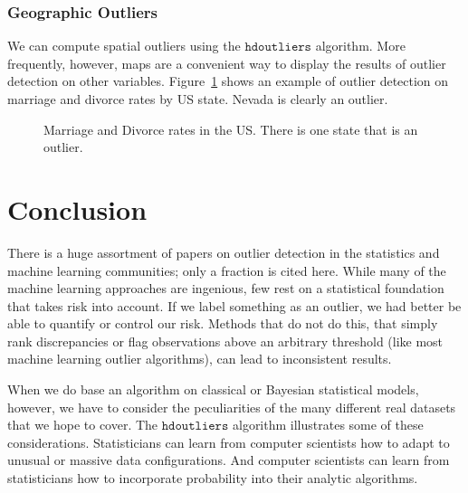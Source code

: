\documentclass[12pt]{article}
\begin{document}
\subsubsection{Geographic Outliers}
We can compute spatial outliers using the $\mathtt{hdoutliers}$ algorithm. More frequently, however, maps are a convenient way to display the results of outlier detection on other variables. Figure~\ref{fig:Marriage} shows an example of outlier detection on marriage and divorce rates by US state. Nevada is clearly an outlier.

\begin{figure}[h]
\caption{\label{fig:Marriage} Marriage and Divorce rates in the US. There is one state that is an outlier.}
\end{figure}
  

\section{Conclusion}
There is a huge assortment of papers on outlier detection in the statistics and machine learning communities; only a fraction is cited here. While many of the machine learning approaches are ingenious, few rest on a statistical foundation that takes risk into account. If we label something as an outlier, we had better be able to quantify or control our risk.  Methods that do not do this, that simply rank discrepancies or flag observations above an arbitrary threshold (like most machine learning outlier algorithms), can lead to inconsistent results. 

When we do base an algorithm on classical or Bayesian statistical models, however, we have to consider the peculiarities of the many different real datasets that we hope to cover. The $\mathtt{hdoutliers}$ algorithm illustrates some of these considerations. Statisticians can learn from computer scientists how to adapt to unusual or massive data configurations. And computer scientists can learn from statisticians how to incorporate probability into their analytic algorithms.




\end{document}
